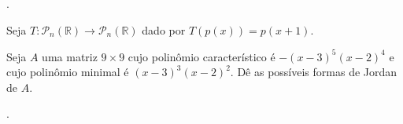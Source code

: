 \begin{questions}
	\begin{solutionordottedlines}
		.
	\end{solutionordottedlines}

	\question\label{exercício:4.4}

	Seja
	\begin{math}
		T\colon
		\mathcal{P}_{n}
		\left(\mathbb{R}\right)\to
		\mathcal{P}_{n}
		\left(\mathbb{R}\right)
	\end{math}
	dado por $T\left(p\left(x\right)\right)=p\left(x+1\right)$.


	\begin{parts}
		\part

		\part
	\end{parts}

	\question\label{exercício:4.5}

	Seja $A$ uma matriz $9\times9$ cujo polinômio característico é
	$-{\left(x-3\right)}^{5}{\left(x-2\right)}^{4}$ e cujo polinômio
	minimal é $\left(x-3\right)^{3}{\left(x-2\right)}^{2}$.
	Dê as possíveis formas de Jordan de $A$.


	\begin{solutionordottedlines}
		.
	\end{solutionordottedlines}

	\question\label{exercício:4.6}


\end{questions}
